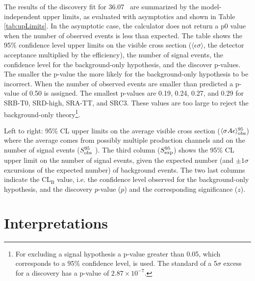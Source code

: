 The results of the discovery fit for 36.07 \ifb\ are summarized by the
model-independent upper limits, as evaluated with asymptotics
and shown in Table \ref{tab:upLimits}. In the asymptotic case, the calculator does not return a p0 value when the number of observed events is less than expected.  The table shows the 95\% confidence level upper limits on the visible cross section ($\langle \epsilon \sigma \rangle$, the detector acceptance multiplied by the efficiency), the number of signal events, the confidence level for the background-only hypothesis, and the discover p-values.  The smaller the p-value the more likely for the background-only hypothesis to be incorrect.  When the number of observed events are smaller than predicted a p-value of 0.50 is assigned.  The smallest p-values are 0.19, 0.24, 0.27, and 0.29 for SRB-T0, SRD-high, SRA-TT, and SRC3.  These values are too large to reject the background-only theory\footnote{For excluding a signal hypothesis a p-value greater than 0.05, which corresponds to a 95\% confidence level, is used.  The standard of a 5$\sigma$ excess for a discovery has a p-value of $2.87 \times 10^{-7}$.}. \\

\begin{table}[htpb]
  \caption[95\% CL upper limits]{Left to right: 95\% CL upper limits on the average visible cross section
($\langle\sigma A \epsilon\rangle_{\rm obs}^{95}$) where the average comes from possibly multiple production channels and on the number of
signal events ($S_{\rm obs}^{95}$ ).  The third column
($S_{\rm exp}^{95}$) shows the 95\% CL upper limit on the number of
signal events, given the expected number (and $\pm 1\sigma$
excursions of the expected number) of background events.
The two last columns indicate the CL$_\mathrm{B}$ value, i.e. the confidence level observed for the background-only hypothesis, and the discovery $p$-value ($p$) and the corresponding significance ($z$).
}
\label{tab:upLimits}

\begin{center}
    
\end{center}
\end{table}
%
\clearpage


\section{Interpretations}

